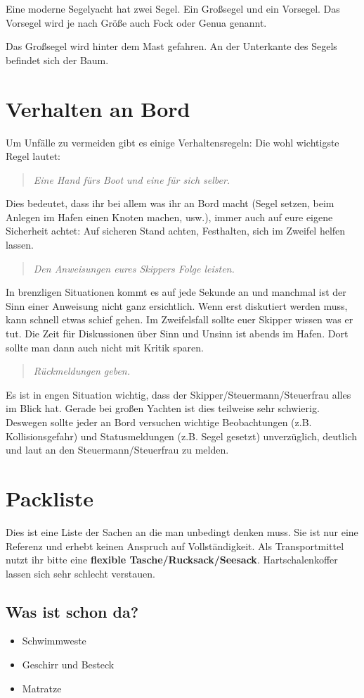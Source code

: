 \documentclass[12pt]{article}
\begin{document}
Eine moderne Segelyacht hat zwei Segel. Ein Großsegel und ein Vorsegel.
Das Vorsegel wird je nach Größe auch Fock oder Genua genannt.

Das Großsegel wird hinter dem Mast gefahren. An der Unterkante des Segels befindet sich der Baum.

\section{Verhalten an Bord}
Um Unfälle zu vermeiden gibt es einige Verhaltensregeln: Die wohl
wichtigste Regel lautet:
\begin{quote}
\textit{Eine Hand fürs Boot und eine für sich selber.}
\end{quote}
Dies bedeutet, dass ihr bei allem was ihr an Bord macht (Segel setzen,
beim Anlegen im Hafen einen Knoten machen, usw.), immer auch auf eure
eigene Sicherheit achtet: Auf sicheren Stand achten, Festhalten, sich im Zweifel helfen lassen.
\begin{quote}
\textit{Den Anweisungen eures Skippers Folge leisten.}
\end{quote}
In brenzligen Situationen kommt es auf jede Sekunde an und
manchmal ist der Sinn einer Anweisung nicht ganz ersichtlich. Wenn erst diskutiert werden muss, kann schnell etwas schief gehen. Im Zweifelsfall sollte euer Skipper wissen was er tut. Die Zeit für Diskussionen über Sinn und Unsinn ist abends im Hafen. Dort sollte man dann auch nicht mit Kritik sparen.

\begin{quote}
\textit{Rückmeldungen geben.}
\end{quote}
Es ist in engen Situation wichtig, dass der Skipper/Steuermann/Steuerfrau alles im Blick hat. Gerade bei großen Yachten ist dies teilweise sehr schwierig. Deswegen sollte jeder an Bord versuchen wichtige Beobachtungen (z.B. Kollisionsgefahr) und Statusmeldungen (z.B. Segel gesetzt) unverzüglich, deutlich und laut an den Steuermann/Steuerfrau zu melden.

\section{Packliste}
Dies ist eine Liste der Sachen an die man unbedingt denken muss. Sie ist nur eine Referenz und erhebt keinen Anspruch auf Vollständigkeit. Als Transportmittel nutzt ihr bitte eine \textbf{flexible Tasche/Rucksack/Seesack}. Hartschalenkoffer lassen sich sehr schlecht verstauen.

\subsection*{Was ist schon da?}
\begin{itemize}
\renewcommand{\labelitemi}{$\boxempty$}
\item Schwimmweste
\item Geschirr und Besteck
\item Matratze
\end{itemize}
\end{document}
